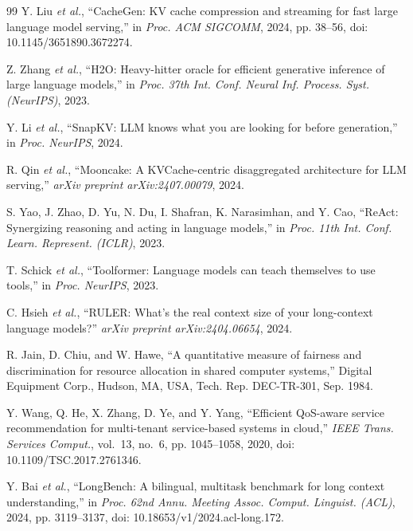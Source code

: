 \documentclass[journal]{IEEEtran}
\begin{document}
\begin{thebibliography}{99}
Y. Liu \textit{et al.}, ``{CacheGen}: KV cache compression and streaming for fast large language model serving,'' in \textit{Proc. ACM SIGCOMM}, 2024, pp. 38--56, doi: 10.1145/3651890.3672274.

Z. Zhang \textit{et al.}, ``{H2O}: Heavy-hitter oracle for efficient generative inference of large language models,'' in \textit{Proc. 37th Int. Conf. Neural Inf. Process. Syst. (NeurIPS)}, 2023.

Y. Li \textit{et al.}, ``{SnapKV}: LLM knows what you are looking for before generation,'' in \textit{Proc. NeurIPS}, 2024.

R. Qin \textit{et al.}, ``{Mooncake}: A KVCache-centric disaggregated architecture for LLM serving,'' \textit{arXiv preprint arXiv:2407.00079}, 2024.

S. Yao, J. Zhao, D. Yu, N. Du, I. Shafran, K. Narasimhan, and Y. Cao, ``{ReAct}: Synergizing reasoning and acting in language models,'' in \textit{Proc. 11th Int. Conf. Learn. Represent. (ICLR)}, 2023.

T. Schick \textit{et al.}, ``{Toolformer}: Language models can teach themselves to use tools,'' in \textit{Proc. NeurIPS}, 2023.

C. Hsieh \textit{et al.}, ``{RULER}: What's the real context size of your long-context language models?'' \textit{arXiv preprint arXiv:2404.06654}, 2024.

R. Jain, D. Chiu, and W. Hawe, ``A quantitative measure of fairness and discrimination for resource allocation in shared computer systems,'' Digital Equipment Corp., Hudson, MA, USA, Tech. Rep. DEC-TR-301, Sep. 1984.

Y. Wang, Q. He, X. Zhang, D. Ye, and Y. Yang, ``Efficient QoS-aware service recommendation for multi-tenant service-based systems in cloud,'' \textit{IEEE Trans. Services Comput.}, vol.~13, no.~6, pp. 1045--1058, 2020, doi: 10.1109/TSC.2017.2761346.

Y. Bai \textit{et al.}, ``{LongBench}: A bilingual, multitask benchmark for long context understanding,'' in \textit{Proc. 62nd Annu. Meeting Assoc. Comput. Linguist. (ACL)}, 2024, pp. 3119--3137, doi: 10.18653/v1/2024.acl-long.172.

\end{thebibliography}
\end{document}
